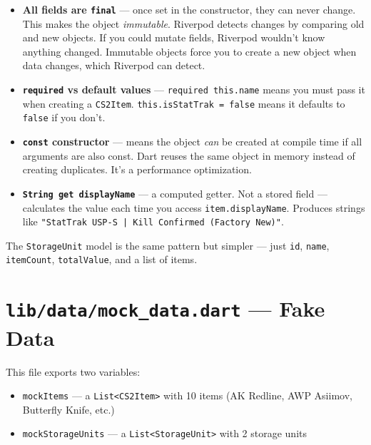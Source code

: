 \documentclass[11pt, a4paper]{article}
\begin{document}
\begin{itemize}
    \item \textbf{All fields are \texttt{final}} --- once set in the constructor, they can never change. This makes the object \emph{immutable}. Riverpod detects changes by comparing old and new objects. If you could mutate fields, Riverpod wouldn't know anything changed. Immutable objects force you to create a new object when data changes, which Riverpod can detect.

    \item \textbf{\texttt{required} vs default values} --- \texttt{required this.name} means you must pass it when creating a \texttt{CS2Item}. \texttt{this.isStatTrak = false} means it defaults to \texttt{false} if you don't.

    \item \textbf{\texttt{const} constructor} --- means the object \emph{can} be created at compile time if all arguments are also const. Dart reuses the same object in memory instead of creating duplicates. It's a performance optimization.

    \item \textbf{\texttt{String get displayName}} --- a computed getter. Not a stored field --- calculates the value each time you access \texttt{item.displayName}. Produces strings like \texttt{"StatTrak\texttrademark{} USP-S | Kill Confirmed (Factory New)"}.
\end{itemize}

The \texttt{StorageUnit} model is the same pattern but simpler --- just \texttt{id}, \texttt{name}, \texttt{itemCount}, \texttt{totalValue}, and a list of items.

\newpage

\section{\texttt{lib/data/mock\_data.dart} --- Fake Data}

This file exports two variables:

\begin{itemize}
    \item \texttt{mockItems} --- a \texttt{List<CS2Item>} with 10 items (AK Redline, AWP Asiimov, Butterfly Knife, etc.)
    \item \texttt{mockStorageUnits} --- a \texttt{List<StorageUnit>} with 2 storage units
\end{itemize}
\end{document}
